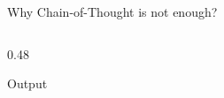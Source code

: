 \begin{frame}{Why Chain-of-Thought is not enough?}
\begin{columns}[T]
\begin{column}{0.48\textwidth}
\begin{block}{\CoT{} Output}
\end{block}

\end{column}

\end{columns}




\end{frame}